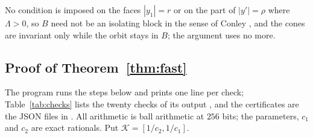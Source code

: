\documentclass[11pt]{article}
\theoremstyle{definition}
\newcommand{\Kset}{\mathcal{K}}
\begin{document}
No condition is imposed on the faces $|y_1| = r$ or on the part of $|y'| = \rho$ where $\Lambda > 0$, so $B$ need not be an isolating block in the sense of Conley \cite{conley1978}, and the cones are invariant only while the orbit stays in $B$; the argument uses no more.

\subsection{Proof of Theorem~\ref{thm:fast}}\label{sec:proof-fast}

The program  runs the steps below and prints one line per check; Table~\ref{tab:checks} lists the twenty checks of its output , and the certificates are the JSON files in . All arithmetic is ball arithmetic at $256$ bits; the parameters, $c_1$ and $c_2$ are exact rationals. Put $\Kset = [1/c_2, 1/c_1]$.
\end{document}
